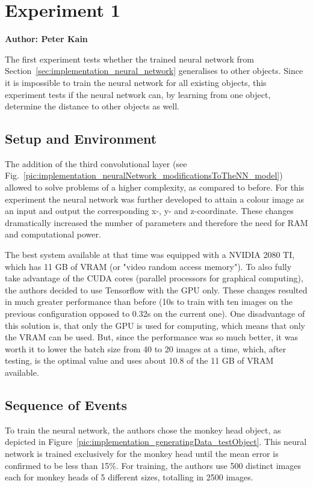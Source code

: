 \chapter{Experiment 1}
\label{cap:experiment1}

\textbf{Author: Peter Kain} 

The first experiment tests whether the trained neural network from Section~\ref{sec:implementation_neural_network} generalises to other objects. Since it is impossible to train the neural network for all existing objects, this experiment tests if the neural network can, by learning from one object, determine the distance to other objects as well.

\section{Setup and Environment}
The addition of the third convolutional layer (see Fig.~\ref{pic:implementation_neuralNetwork_modificationsToTheNN_model}) allowed to solve problems of a higher complexity, as compared to before. For this experiment the neural network was further developed to attain a colour image as an input and output the corresponding x-, y- and z-coordinate. These changes dramatically increased the number of parameters and therefore the need for RAM and computational power. 

The best system available at that time was equipped with a NVIDIA 2080 TI, which has 11 GB of VRAM (or "video random access memory"). To also fully take advantage of the CUDA cores (parallel processors for graphical computing), the authors decided to use Tensorflow with the GPU only. These changes resulted in much greater performance than before (10s to train with ten images on the previous configuration opposed to 0.32s on the current one). One disadvantage of this solution is, that only the GPU is used for computing, which means that only the VRAM can be used. But, since the performance was so much better, it was worth it to lower the batch size from 40 to 20 images at a time, which, after testing, is the optimal value and uses about 10.8 of the 11 GB of VRAM available.

\section{Sequence of Events}
To train the neural network, the authors chose the monkey head object, as depicted in Figure~\ref{pic:implementation_generatingData_testObject}. This neural network is trained exclusively for the monkey head until the mean error is confirmed to be less than 15\%. For training, the authors use 500 distinct images each for monkey heads of 5 different sizes, totalling in 2500 images.

